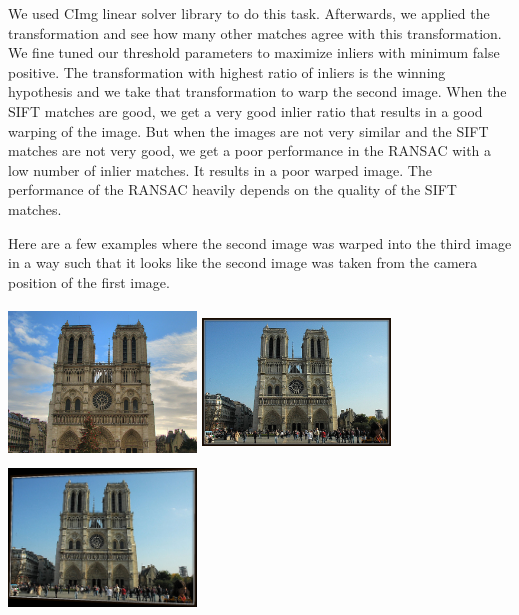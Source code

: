 \documentclass{article}
\begin{document}
\begin{enumerate}
					We used CImg linear solver library to do this task. Afterwards, we applied the transformation and see how many other matches agree with this transformation. We fine tuned our threshold parameters to maximize inliers with minimum false positive. The transformation with highest ratio of inliers is the winning hypothesis and we take that transformation to warp the second image. When the SIFT matches are good, we get a very good inlier ratio that results in a good warping of the image. But when the images are not very similar and the SIFT matches are not very good, we get a poor performance in the RANSAC with a low number of inlier matches. It results in a poor warped image. The performance of the RANSAC heavily depends on the quality of the SIFT matches. 
					
					Here are a few examples where the second image was warped into the third image in a way such that it looks like the second image was taken from the camera position of the first image.
					
					\begin{center}
						\includegraphics[height=4cm,width=5cm]{111a} \includegraphics[height=4cm,width=5cm]{111b} 
						\includegraphics[height=4cm,width=5cm]{111c} 
					\end{center}
					

\end{enumerate}
\end{document}
